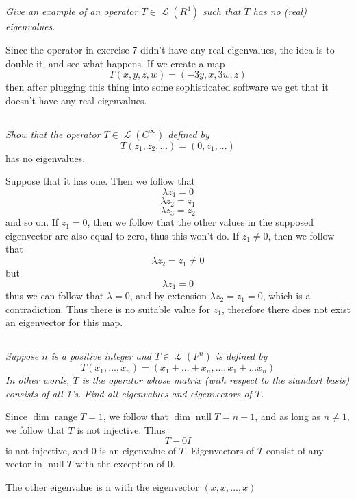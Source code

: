 \documentclass[11pt,oneside,titlepage]{book}
\DeclareMathOperator \map {\mathcal {L}}
\DeclareMathOperator \ns {null}
\DeclareMathOperator \range {range}
\begin{document}
\subsection{}

\textit{Give an example of an operator $T \in \map(R^4)$ such that $T$ has no (real) eigenvalues.}

Since the operator in exercise 7 didn't have any real eigenvalues, the idea is to double it,
and see what happens. If we create a map
$$T(x, y, z, w) = (-3y, x, 3w, z)$$
then after plugging this thing into some sophisticated software we get that it doesn't
have any real eigenvalues.

\subsection{}

\textit{Show that the operator $T \in \map(C^\infty)$ defined by}
$$T(z_1, z_2, ...) = (0, z_1, ... )$$
has no eigenvalues.

Suppose that it has one. Then we follow that
$$\lambda z_1 =  0$$
$$\lambda z_2 = z_1$$
$$\lambda z_3 = z_2$$
and so on. If $z_1 = 0$, then we follow that the other values in the supposed eigenvector are
also equal to zero, thus this won't do. If $z_1 \neq 0$, then we follow that
$$\lambda z_2 = z_1  \neq 0$$
but
$$\lambda z_1 = 0$$
thus we can follow that $\lambda = 0$, and by extension $\lambda z_2 = z_1 = 0$, which is a
contradiction. Thus there is no suitable value for $z_1$, therefore there does not exist an
eigenvector for this map.


\subsection{}

\textit{Suppose $n$ is a positive integer and $T \in \map(F^n)$ is defined by}
$$T(x_1, ..., x_n) = (x_1 + ... + x_n, ..., x_1 + ... x_n)$$
\textit{In other words, $T$ is the operator whose matrix (with respect to the standart basis)
  consists of all 1's. Find all eigenvalues and eigenvectors of $T$.}


Since $\dim \range T = 1$, we follow that $\dim \ns T = n - 1$, and as long as $n \neq 1$, we
follow that $T$ is not injective. Thus
$$T - 0I$$
is not injective, and $0$ is an eigenvalue of $T$. Eigenvectors of $T$ consist of any vector in
$\ns T$ with the exception of $0$.

The other eigenvalue is n with the eigenvector $(x, x, ..., x)$
\end{document}
